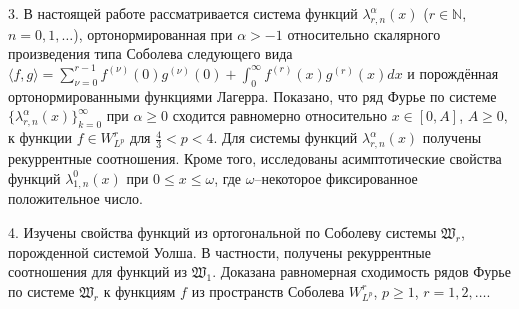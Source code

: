 3. В настоящей работе рассматривается система функций $\lambda_{r,n}^{\alpha}(x)$ ($r\in\mathbb{N}$, $n=0, 1, \ldots$), ортонормированная при $\alpha>-1$ относительно скалярного произведения типа Соболева следующего вида $\langle f,g\rangle=\sum_{\nu=0}^{r-1}f^{(\nu)}(0)g^{(\nu)}(0)+\int_{0}^{\infty} f^{(r)}(x)g^{(r)}(x) dx$ и порождённая ортонормированными функциями Лагерра.
Показано, что ряд Фурье по системе $\{\lambda_{r,n}^{\alpha}(x)\}_{k=0}^\infty$ при $\alpha\geq0$ сходится равномерно относительно $x\in[0, A]$, $A\geq0,$ к функции $f\in W^r_{L^p}$ для $\frac{4}{3}<p<4$.
Для системы функций $\lambda_{r,n}^{\alpha}(x)$ получены рекуррентные соотношения.
Кроме того, исследованы асимптотические свойства функций $\lambda_{1,n}^0(x)$ при $0\leq x\leq\omega$, где $\omega$--некоторое фиксированное положительное число.

4. Изучены свойства функций из ортогональной по Соболеву системы $\mathfrak{W}_r$, порожденной системой Уолша. 
В частности, получены рекуррентные соотношения для функций из $\mathfrak{W}_1$.
Доказана равномерная сходимость рядов Фурье по системе $\mathfrak{W}_r$ к функциям $f$ из пространств Соболева $W^r_{L^p}$, $p \ge 1$,  $r=1,2,\ldots$.
